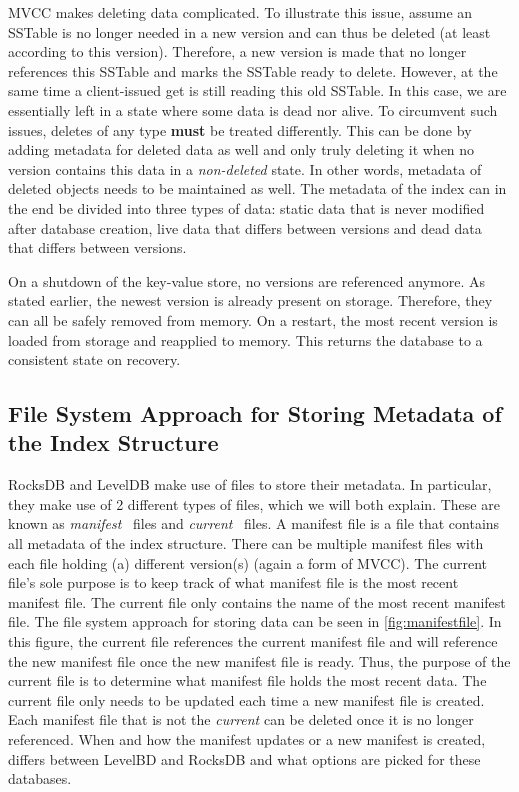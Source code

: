 MVCC makes deleting data complicated. To illustrate this issue, assume an SSTable is no longer needed in a new version and can thus be deleted (at least according to this version). Therefore, a new version is made that no longer references this SSTable and marks the SSTable ready to delete. However, at the same time a client-issued get is still reading this old SSTable. In this case, we are essentially left in a state where some data is dead nor alive. To circumvent such issues, deletes of any type \textbf{must} be treated differently. This can be done by adding metadata for deleted data as well and only truly deleting it when no version contains this data in a \textit{non-deleted} state. In other words, metadata of deleted objects needs to be maintained as well. The metadata of the index can in the end be divided into three types of data: static data that is never modified after database creation, live data that differs between versions and dead data that differs between versions.

On a shutdown of the key-value store, no versions are referenced anymore. As stated earlier, the newest version is already present on storage. Therefore, they can all be safely removed from memory. On a restart, the most recent version is loaded from storage and reapplied to memory. This returns the database to a consistent state on recovery. 

\subsection{File System Approach for Storing Metadata of the Index Structure}
RocksDB and LevelDB make use of files to store their metadata. In particular, they make use of 2 different types of files, which we will both explain. These are known as \textit{manifest}~\cite{dong2017optimizing} files and \textit{current}~\cite{RocksDB} files. A manifest file is a file that contains all metadata of the index structure. There can be multiple manifest files with each file holding (a) different version(s) (again a form of MVCC). The current file's sole purpose is to keep track of what manifest file is the most recent manifest file. The current file only contains the name of the most recent manifest file. The file system approach for storing data can be seen in \autoref{fig:manifestfile}. In this figure, the current file references the current manifest file and will reference the new manifest file once the new manifest file is ready. Thus, the purpose of the current file is to determine what manifest file holds the most recent data. The current file only needs to be updated each time a new manifest file is created. Each manifest file that is not the \textit{current} can be deleted once it is no longer referenced. When and how the manifest updates or a new manifest is created, differs between LevelBD and RocksDB and what options are picked for these databases. 


